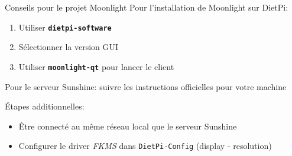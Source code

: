 \documentclass[
aspectratio=169 %
]{beamer}
\newcommand{\cmd}[1]{\texttt{\textbf{#1}}}
\begin{document}
\begin{frame}{Conseils pour le projet Moonlight}
    Pour l'installation de Moonlight sur DietPi:
    \begin{enumerate}
        \item Utiliser \cmd{dietpi-software}
        \item Sélectionner la version GUI
        \item Utiliser \cmd{moonlight-qt} pour lancer le client
    \end{enumerate}

    \bigskip
    Pour le serveur Sunshine: suivre les instructions officielles pour votre
    machine

    \bigskip
    Étapes additionnelles:
    \begin{itemize}
        \item Être connecté au même réseau local que le serveur Sunshine
        \item Configurer le driver \textit{FKMS} dans \texttt{DietPi-Config}
              (display - resolution)
    \end{itemize}

\end{frame}
\end{document}
